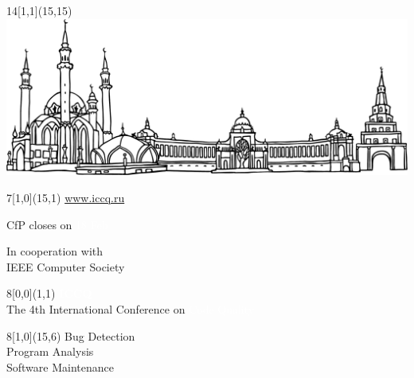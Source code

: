\documentclass{article}
\begin{document}
\selectfont
\raggedbottom
\raggedright
\setlength{\topskip}{6pt}
\setlength{\parindent}{0pt} %
\setlength{\parskip}{6pt} %
\color{xblack}

\newcommand\invert[1]{\colorbox{xred}{\textcolor{white}{#1}}}

\begin{textblock}{14}[1,1](15,15)
  \raggedleft
  \includegraphics[width=14\TPHorizModule]{../../cfp/kazan}
\end{textblock}

\begin{textblock}{7}[1,0](15,1)
  \raggedleft\large
  \underline{www.iccq.ru}

  \textcolor{xred}{CfP closes on \invert{18 Feb}}

  In cooperation with \\
  IEEE Computer Society
\end{textblock}

\begin{textblock}{8}[0,0](1,1)
  {
  \fontsize{42}{42}
  \selectfont
  \bfseries
  \invert{ICCQ}
  }\\[12pt]

  \Large
  The 4th International Conference \newline
  on \invert{Code Quality}
\end{textblock}

\begin{textblock}{8}[1,0](15,6)
  \raggedleft\large
  Bug Detection \\
  Program Analysis \\
  Software Maintenance
\end{textblock}
\end{document}
